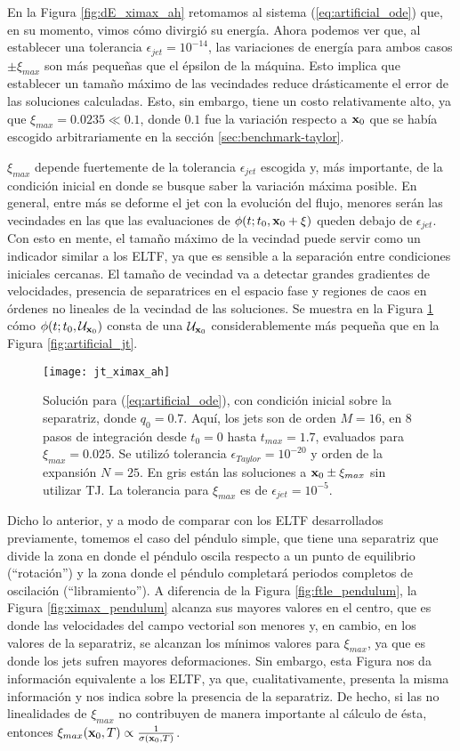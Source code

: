 En la Figura \ref{fig:dE_ximax_ah} retomamos al sistema (\ref{eq:artificial_ode}) que, en su momento, vimos cómo divirgió su energía. Ahora podemos ver que, al establecer una tolerancia $\epsilon_{jet} = 10^{-14}$, las variaciones de energía para ambos casos $\pm \xi_{max}$ son más pequeñas que el épsilon de la máquina. Esto implica que establecer un tamaño máximo de las vecindades reduce drásticamente el error de las soluciones calculadas. Esto, sin embargo, tiene un costo relativamente alto, ya que $\xi_{max} = 0.0235 \ll 0.1$, donde $0.1$ fue la variación respecto a $\mathbf{x}_0$ que se había escogido arbitrariamente en la sección \ref{sec:benchmark-taylor}. 

$\xi_{max}$ depende fuertemente de la tolerancia $\epsilon_{jet}$ escogida y, más importante, de la condición inicial en donde se busque saber la variación máxima posible. En general, entre más se deforme el jet con la evolución del flujo, menores serán las vecindades en las que las evaluaciones de $\phi(t;t_0,\mathbf{x}_0 + \xi)$ queden debajo de $\epsilon_{jet}$. Con esto en mente, el tamaño máximo de la vecindad puede servir como un indicador similar a los ELTF, ya que es sensible a la separación entre condiciones iniciales cercanas. El tamaño de vecindad va a detectar grandes gradientes de velocidades, presencia de separatrices en el espacio fase y regiones de caos en órdenes no lineales de la vecindad de las soluciones. Se muestra en la Figura \ref{fig:jt_ximax_ah} cómo $\phi(t;t_0,\mathcal{U}_{\mathbf{x}_0} )$ consta de una $\mathcal{U}_{\mathbf{x}_0}$ considerablemente más pequeña que en la Figura \ref{fig:artificial_jt}.

\begin{figure}[h!]
 \centering
 \texttt{[image: jt\_ximax\_ah]}
 \caption{Solución para (\ref{eq:artificial_ode}), con condición inicial sobre la separatriz, donde $q_0 = 0.7$. Aquí, los jets son de orden $M=16$, en $8$ pasos de integración desde $t_0 = 0$ hasta $t_{max} = 1.7$, evaluados para $\xi_{max} = 0.025$. Se utilizó tolerancia $\epsilon_{Taylor} = 10^{-20}$ y orden de la expansión $N=25$. En gris están las soluciones a $\mathbf{x}_0 \pm \xi_{max}$ sin utilizar TJ. La tolerancia para $\xi_{max}$ es de $\epsilon_{jet} = 10^{-5}$.}
 \label{fig:jt_ximax_ah}
\end{figure}

Dicho lo anterior, y a modo de comparar con los ELTF desarrollados previamente, tomemos el caso del péndulo simple, que tiene una separatriz que divide la zona en donde el péndulo oscila respecto a un punto de equilibrio (``rotación'') y la zona donde el péndulo completará periodos completos de oscilación (``libramiento''). A diferencia de la Figura \ref{fig:ftle_pendulum}, la Figura \ref{fig:ximax_pendulum} alcanza sus mayores valores en el centro, que es donde las velocidades del campo vectorial son menores y, en cambio, en los valores de la separatriz, se alcanzan los mínimos valores para $\xi_{max}$, ya que es donde los jets sufren mayores deformaciones. Sin embargo, esta Figura nos da información equivalente a los ELTF, ya que, cualitativamente, presenta la misma información y nos indica sobre la presencia de la separatriz. De hecho, si las no linealidades de $\xi_{max}$ no contribuyen de manera importante al cálculo de ésta, entonces $\xi_{max}(\mathbf{x}_0,T) \propto \frac{1}{\sigma(\mathbf{x}_0,T)}$. 

